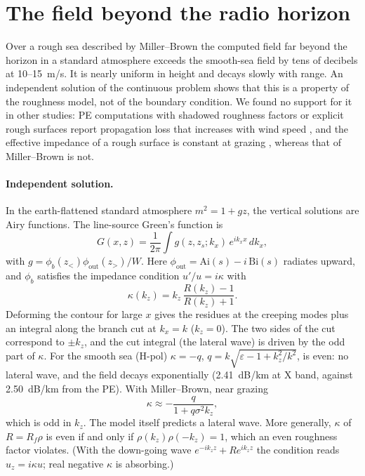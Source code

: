 \documentclass[11pt,a4paper]{article}
\newcommand{\kz}{k_z}
\begin{document}
\section{The field beyond the radio horizon}\label{sec:lateral}

Over a rough sea described by Miller--Brown the computed field far beyond the
horizon in a standard atmosphere exceeds the smooth-sea field by tens of decibels
at 10--\SI{15}{m/s}. It is nearly uniform in height and decays slowly with range. An
independent solution of the continuous problem shows that this is a property of
the roughness model, not of the boundary condition. We found no support for it in
other studies: PE computations with shadowed roughness factors or explicit rough
surfaces report propagation loss that increases with wind speed
\cite{gao2019,song2024}, and the effective impedance of a rough surface is constant
at grazing \cite{barrick1998}, whereas that of Miller--Brown is not.

\paragraph{Independent solution.}
In the earth-flattened standard atmosphere $m^2=1+gz$, the vertical solutions are
Airy functions. The line-source Green's function is
\begin{equation}
  G(x,z)=\frac{1}{2\pi}\int g(z,z_s;k_x)\,e^{ik_xx}\,dk_x,
\end{equation}
with $g=\phi_b(z_<)\phi_{\mathrm{out}}(z_>)/W$. Here
$\phi_{\mathrm{out}}=\mathrm{Ai}(s)-i\,\mathrm{Bi}(s)$ radiates upward, and $\phi_b$
satisfies the impedance condition $u'/u=i\kappa$ with
\begin{equation}
  \kappa(\kz)=\kz\,\frac{R(\kz)-1}{R(\kz)+1}.
\end{equation}
Deforming the contour for large $x$ gives the residues at the creeping modes plus
an integral along the branch cut at $k_x=k$ ($\kz=0$). The two sides of the cut
correspond to $\pm\kz$, and the cut integral (the lateral wave) is driven by the
odd part of $\kappa$. For the smooth sea (H-pol) $\kappa=-q$,
$q=k\sqrt{\varepsilon-1+\kz^2/k^2}$, is even: no lateral wave, and the field decays
exponentially (\SI{2.41}{dB/km} at X band, against \SI{2.50}{dB/km} from the PE).
With Miller--Brown, near grazing
\begin{equation}
  \kappa\approx-\frac{q}{1+q\sigma^2\kz},
\end{equation}
which is odd in $\kz$. The model itself predicts a lateral wave. More generally,
$\kappa$ of $R=R_f\rho$ is even if and only if $\rho(\kz)\rho(-\kz)=1$, which an even
roughness factor violates. (With the down-going wave $e^{-i\kz z}+Re^{i\kz z}$ the
condition reads $u_z=i\kappa u$; real negative $\kappa$ is absorbing.)
\end{document}
